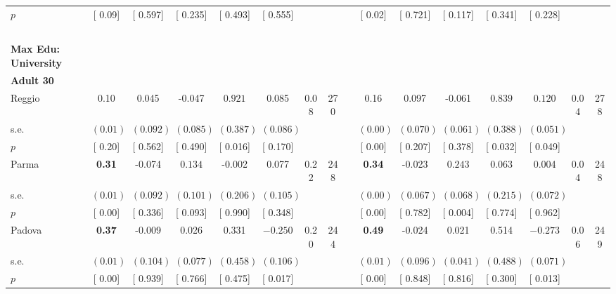 \begin{longtable}{L{8em} c c c c c c c p{1em} c c c c c c c}
\quad \quad \quad \quad $ p$ & [     0.09] & [    0.597] & [    0.235] & [    0.493] & [    0.555] & & & & [     0.02] & [    0.721] & [    0.117] & [    0.341] & [    0.228] & &  \\[1em]
~\\[1em]
\textbf{Max Edu: University} \\*
\quad \quad \textbf{Adult 30} & & & & & & & & & & & & & & & \\* 
\quad \quad \quad Reggio& 0.10 &     0.045 &    -0.047 & $ \mathbf{    0.921}$ &     0.085 &      0.08 &       270 & & 0.16 &     0.097 &    -0.061 & $ \mathbf{    0.839}$ & $ \mathbf{    0.120}$ &      0.04 &       278  \\*
\quad \quad \quad \quad s.e.& $ (     0.01)$ & $ (    0.092)$ & $ (    0.085)$ & $ (    0.387)$ & $ (    0.086)$ & & & & $ (     0.00)$ & $ (    0.070)$ & $ (    0.061)$ & $ (    0.388)$ & $ (    0.051)$ & &  \\*
\quad \quad \quad \quad $ p$ & [     0.20] & [    0.562] & [    0.490] & [    0.016] & [    0.170] & & & & [     0.00] & [    0.207] & [    0.378] & [    0.032] & [    0.049] & &  \\[1em]
\quad \quad \quad Parma& \textbf{     0.31} &    -0.074 & $ \mathbf{    0.134}$ &    -0.002 &     0.077 &      0.22 &       248 & & \textbf{     0.34} &    -0.023 & $ \mathbf{    0.243}$ &     0.063 &     0.004 &      0.04 &       248  \\*
\quad \quad \quad \quad s.e.& $ (     0.01)$ & $ (    0.092)$ & $ (    0.101)$ & $ (    0.206)$ & $ (    0.105)$ & & & & $ (     0.00)$ & $ (    0.067)$ & $ (    0.068)$ & $ (    0.215)$ & $ (    0.072)$ & &  \\*
\quad \quad \quad \quad $ p$ & [     0.00] & [    0.336] & [    0.093] & [    0.990] & [    0.348] & & & & [     0.00] & [    0.782] & [    0.004] & [    0.774] & [    0.962] & &  \\[1em]
\quad \quad \quad Padova& \textbf{     0.37} &    -0.009 &     0.026 &     0.331 & $ \mathbf{   -0.250}$ &      0.20 &       244 & & \textbf{     0.49} &    -0.024 &     0.021 &     0.514 & $ \mathbf{   -0.273}$ &      0.06 &       249  \\*
\quad \quad \quad \quad s.e.& $ (     0.01)$ & $ (    0.104)$ & $ (    0.077)$ & $ (    0.458)$ & $ (    0.106)$ & & & & $ (     0.01)$ & $ (    0.096)$ & $ (    0.041)$ & $ (    0.488)$ & $ (    0.071)$ & &  \\*
\quad \quad \quad \quad $ p$ & [     0.00] & [    0.939] & [    0.766] & [    0.475] & [    0.017] & & & & [     0.00] & [    0.848] & [    0.816] & [    0.300] & [    0.013] & &  \\[1em]

\end{longtable}
